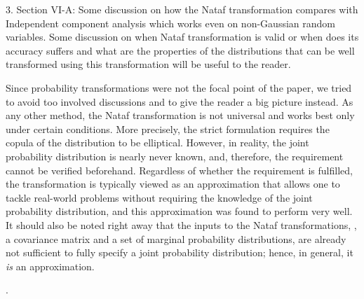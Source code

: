 \begin{reviewer}
3. Section VI-A:  Some discussion on how the Nataf transformation compares with Independent component analysis which works even on non-Gaussian random variables. Some discussion on when Nataf transformation is valid or when does its accuracy suffers and what are the properties of the distributions that can be well transformed using this transformation will be useful to the reader.
\end{reviewer}
\begin{authors}
Since probability transformations were not the focal point of the paper, we tried to avoid too involved discussions and to give the reader a big picture instead.
As any other method, the Nataf transformation is not universal and works best only under certain conditions.
More precisely, the strict formulation requires the copula of the distribution to be elliptical.
However, in reality, the joint probability distribution is nearly never known, and, therefore, the requirement cannot be verified beforehand.
Regardless of whether the requirement is fulfilled, the transformation is typically viewed as an approximation that allows one to tackle real-world problems without requiring the knowledge of the joint probability distribution, and this approximation was found to perform very well.
It should also be noted right away that the inputs to the Nataf transformations, \ie, a covariance matrix and a set of marginal probability distributions, are already not sufficient to fully specify a joint probability distribution; hence, in general, it \emph{is} an approximation.

.


\end{authors}

